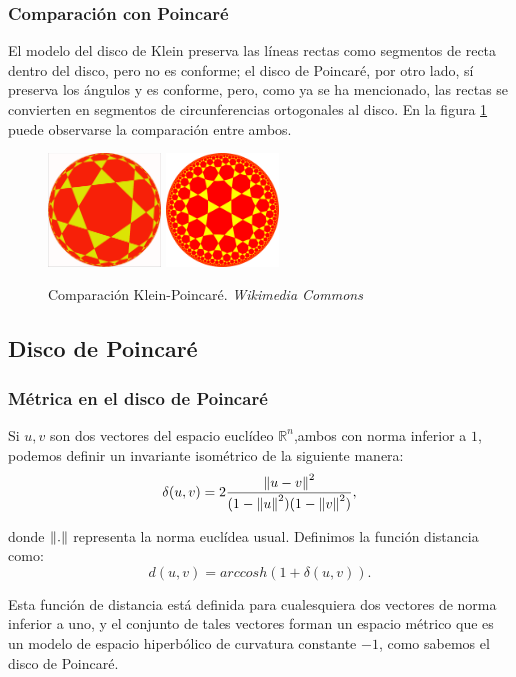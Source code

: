 \documentclass{article}
\theoremstyle{plain}
\theoremstyle{definition}
\theoremstyle{remark}
\newcommand{\norm}[1]{\ensuremath\left\Vert #1 \right\Vert}
\begin{document}
\subsubsection{Comparación con Poincaré}
El modelo del disco de Klein preserva las líneas rectas como segmentos
de recta dentro del disco, pero no es conforme; el disco de Poincaré,
por otro lado, sí preserva los ángulos y es conforme, pero, como ya se
ha mencionado, las rectas se convierten en segmentos de circunferencias
ortogonales al disco. En la figura \ref{kleinpoincare} puede observarse
la comparación entre ambos.

\begin{figure}[ht!]
  \centering
  \includegraphics[width=30mm]{./klein37.png}
  \includegraphics[width=30mm]{./poincare37.png}
  \caption{Comparación Klein-Poincaré. \textit{Wikimedia Commons} \label{kleinpoincare}}
\end{figure}


\subsection{Disco de Poincaré}

\subsubsection{Métrica en el disco de Poincaré}
Si $u,v$ son dos vectores del espacio euclídeo $\mathbb{R}^n$,ambos
con norma inferior a $1$, podemos definir un invariante isométrico de
la siguiente manera:
\[\delta (u,v)=2\frac{\norm{u-v}^2}{(1-\norm{u}^2)(1-\norm{v}^2)},\]

donde $\norm{.}$ representa la norma euclídea usual. Definimos la
función distancia como:
\[d(u,v)=arccosh(1+\delta(u,v)).\]

Esta función de distancia está definida para cualesquiera dos vectores
de norma inferior a uno, y el conjunto de tales vectores forman un
espacio métrico que es un modelo de espacio hiperbólico de curvatura
constante $-1$, como sabemos el disco de Poincaré.
\end{document}
